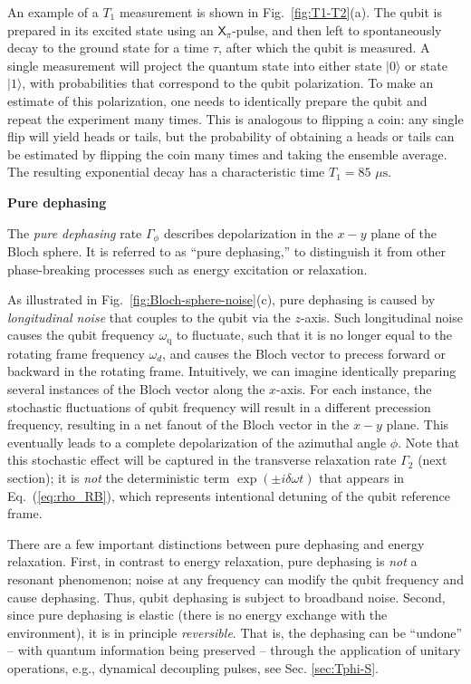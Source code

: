 \documentclass[aip,apr,twocolumn,showpacs,superscriptaddress,groupedaddress,nofootinbib,reprint]{revtex4-1}  %
\newcommand{\X}[1]{\textsf{X}_{#1}}
\newcommand{\freq}{\omega_\text{q}}
\begin{document}
An example of a $T_1$ measurement is shown in Fig.~\ref{fig:T1-T2}(a). The qubit is prepared in its excited state using an $\X{\pi}$-pulse, and then left to spontaneously decay to the ground state for a time $\tau$, after which the qubit is measured. A single measurement will project the quantum state into either state $\lvert0\rangle$ or state $\lvert 1 \rangle$, with probabilities that correspond to the qubit polarization. To make an estimate of this polarization, one needs to identically prepare the qubit and repeat the experiment many times. This is analogous to flipping a coin: any single flip will yield heads or tails, but the probability of obtaining a heads or tails can be estimated by flipping the coin many times and taking the ensemble average. The resulting exponential decay has a characteristic time $T_1 = 85$ $\mu\mathrm{s}$.

\noindent \textbf{Pure dephasing}

The \textit{pure dephasing} rate $\Gamma_{\phi}$ describes depolarization in the $x-y$ plane of the Bloch sphere. It is referred to as ``pure dephasing,'' to distinguish it from other phase-breaking processes such as energy excitation or relaxation.

As illustrated in Fig.~\ref{fig:Bloch-sphere-noise}(c), pure dephasing is caused by {\em longitudinal noise} that couples to the qubit via the $z$-axis. Such longitudinal noise causes the qubit frequency $\freq$ to fluctuate, such that it is no longer equal to the rotating frame frequency $\omega_d$, and causes the Bloch vector to precess forward or backward in the rotating frame. Intuitively, we can imagine identically preparing several instances of the Bloch vector along the $x$-axis. For each instance, the stochastic fluctuations of qubit frequency will result in a different precession frequency, resulting in a net fanout of the Bloch vector in the $x-y$ plane. This eventually leads to a complete depolarization of the azimuthal angle $\phi$. Note that this stochastic effect will be captured in the transverse relaxation rate $\Gamma_2$ (next section); it is \textit{not} the deterministic term $\exp(\pm i \delta \omega t)$ that appears in Eq.~(\ref{eq:rho_RB}), which represents intentional detuning of the qubit reference frame.

There are a few important distinctions between pure dephasing and energy relaxation. First, in contrast to energy relaxation, pure dephasing is \textit{not} a resonant phenomenon; noise at any frequency can modify the qubit frequency and cause dephasing. Thus, qubit dephasing is subject to broadband noise. Second, since pure dephasing is elastic (there is no energy exchange with the environment), it is in principle \textit{reversible}. That is, the dephasing can be ``undone'' -- with quantum information being preserved -- through the application of unitary operations, e.g., dynamical decoupling pulses\cite{Bylander2011}, see Sec. \ref{sec:Tphi-S}.
\end{document}
